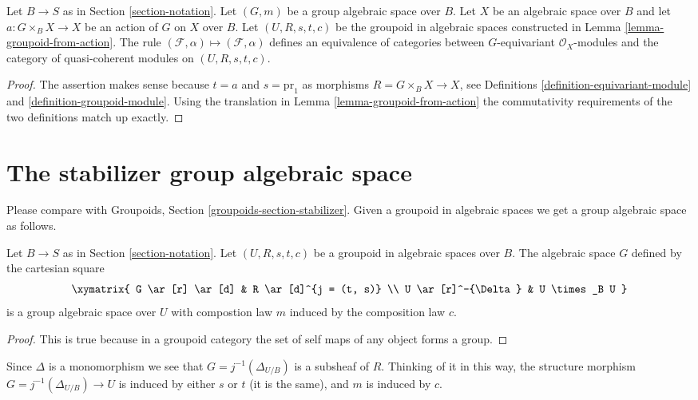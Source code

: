 \begin{lemma}
\label{lemma-action-groupoid-modules}
Let $B \to S$ as in Section \ref{section-notation}.
Let $(G, m)$ be a group algebraic space over $B$.
Let $X$ be an algebraic space over $B$ and let $a : G \times_B X \to X$
be an action of $G$ on $X$ over $B$. Let $(U, R, s, t, c)$ be
the groupoid in algebraic spaces constructed in
Lemma \ref{lemma-groupoid-from-action}.
The rule
$(\mathcal{F}, \alpha) \mapsto (\mathcal{F}, \alpha)$ defines
an equivalence of categories between $G$-equivariant
$\mathcal{O}_X$-modules and the category of quasi-coherent
modules on $(U, R, s, t, c)$.
\end{lemma}

\begin{proof}
The assertion makes sense because $t = a$ and $s = \text{pr}_1$
as morphisms $R = G \times_B X \to X$, see
Definitions \ref{definition-equivariant-module} and
\ref{definition-groupoid-module}.
Using the translation in Lemma \ref{lemma-groupoid-from-action}
the commutativity requirements
of the two definitions match up exactly.
\end{proof}





\section{The stabilizer group algebraic space}
\label{section-stabilizer}

\noindent
Please compare with
Groupoids, Section \ref{groupoids-section-stabilizer}.
Given a groupoid in algebraic spaces we get a group algebraic space as follows.

\begin{lemma}
\label{lemma-groupoid-stabilizer}
Let $B \to S$ as in Section \ref{section-notation}.
Let $(U, R, s, t, c)$ be a groupoid in algebraic spaces over $B$.
The algebraic space $G$ defined by the cartesian square
$$
\xymatrix{
G \ar[r] \ar[d] & R \ar[d]^{j = (t, s)} \\
U \ar[r]^-{\Delta} & U \times_B U
}
$$
is a group algebraic space over $U$ with compostion law
$m$ induced by the composition law $c$.
\end{lemma}

\begin{proof}
This is true because in a groupoid category the
set of self maps of any object forms a group.
\end{proof}

\noindent
Since $\Delta$ is a monomorphism we see that $G = j^{-1}(\Delta_{U/B})$ is a
subsheaf of $R$. Thinking of it in this way, the structure morphism
$G = j^{-1}(\Delta_{U/B}) \to U$ is induced by either $s$ or $t$
(it is the same), and $m$ is induced by $c$.

